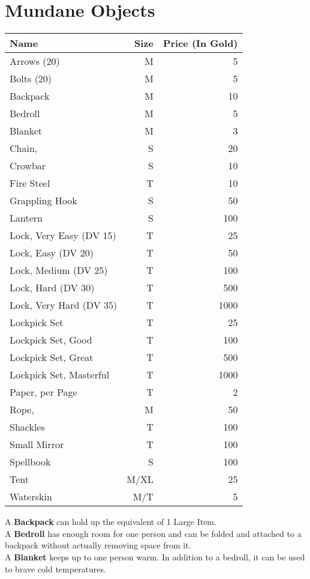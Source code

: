 \onecolumn
\section{Mundane Objects}
\begin{longtable}{l | r | r}
	Name & Size & Price (In Gold)\\ \hline
	Arrows (20) & M & 5\\
	Bolts (20) & M & 5\\
	Backpack & M & 10\\
	Bedroll & M & 5\\
	Blanket & M & 3\\
	Chain, \passus{2} & S & 20\\
	Crowbar & S & 10\\
	Fire Steel & T & 10\\
	Grappling Hook & S & 50\\
	Lantern & S & 100\\
	Lock, Very Easy (DV 15) & T & 25\\
	Lock, Easy (DV 20) & T & 50\\
	Lock, Medium (DV 25) & T & 100\\
	Lock, Hard (DV 30) & T & 500\\
	Lock, Very Hard (DV 35) & T & 1000\\
	Lockpick Set & T & 25\\
	Lockpick Set, Good & T & 100\\
	Lockpick Set, Great & T & 500\\
	Lockpick Set, Masterful & T & 1000\\
	Paper, per Page & T & 2\\
	Rope, \passus{10} & M & 50\\
	Shackles & T & 100\\
	Small Mirror & T & 100\\
	Spellbook & S & 100\\
	Tent & M/XL & 25\\
	Waterskin & M/T & 5\\
\end{longtable}


A \textbf{Backpack} can hold up the equivalent of 1 Large Item.\\

A \textbf{Bedroll} has enough room for one person and can be folded and attached to a backpack without actually removing space from it.\\

A \textbf{Blanket} keeps up to one person warm. In addition to a bedroll, it can be used to brave cold temperatures.\\

